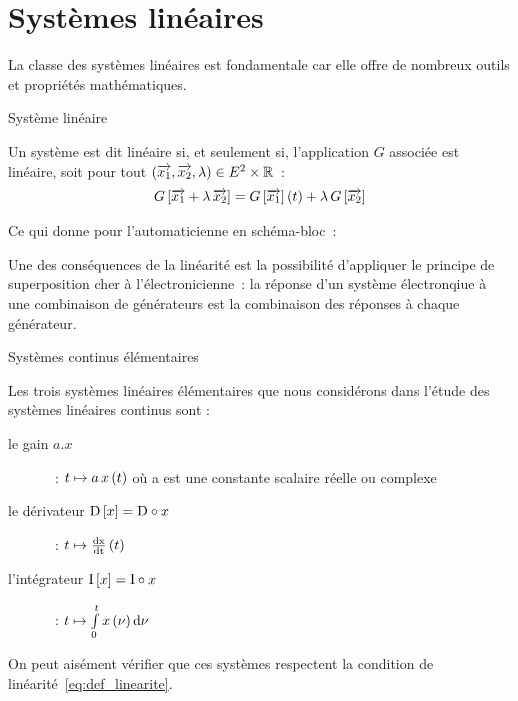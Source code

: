 \section{Systèmes linéaires}


La classe des systèmes linéaires est fondamentale car elle offre de
nombreux outils et propriétés mathématiques.

\begin{definition}{Système linéaire}
  \label{def:linearite}

  \def\xu{\vec{x_1}}
  \def\xd{\vec{x_2}}

  Un système est dit linéaire si, et seulement si, l'application $G$
  associée est linéaire, soit pour tout
  $\p{\xu, \xd, \lambda} \in E^2 \times \R$~:
  \begin{eqnarray}
    \label{eq:def_linearite}
    G\b{\xu + \lambda\, \xd} = G\b{\xu}(t) + \lambda\,G\b{\xd}
  \end{eqnarray}
\end{definition}

Ce qui donne pour l'automaticienne en schéma-bloc~:


Une des conséquences de la linéarité est la possibilité d'appliquer le
principe de superposition cher à l'électronicienne~: \og{} la réponse
d'un système électronqiue à une combinaison de générateurs est la combinaison des
réponses à chaque générateur.\fg{}

\begin{definition}{Systèmes continus élémentaires}
  \label{def:systeme_elementaires_continus}
  
  Les trois systèmes linéaires élémentaires que nous considérons dans
  l'étude des systèmes linéaires continus sont :
  \begin{description}
  \item[le gain $a.x$]~: $t \mapsto a\,x\left(t\right)$ où a est une constante
    scalaire réelle ou complexe
  \item[le dérivateur $\mathrm{D}\left[x\right]=\mathrm{D}\circ x$]~:
    $ t \mapsto \frac{\mathrm{d{x}}}{\mathrm{d{t}}}\left(t\right) $
  \item[l'intégrateur $\mathrm{I}\left[x\right]=\mathrm{I}\circ x$]~:
    $ t \mapsto \int\limits_{0}^{t}{x\left(\nu\right)\mathrm{d{\nu}}}$
  \end{description}
\end{definition}

On peut aisément vérifier que ces systèmes respectent la condition de
linéarité~\ref{eq:def_linearite}.

